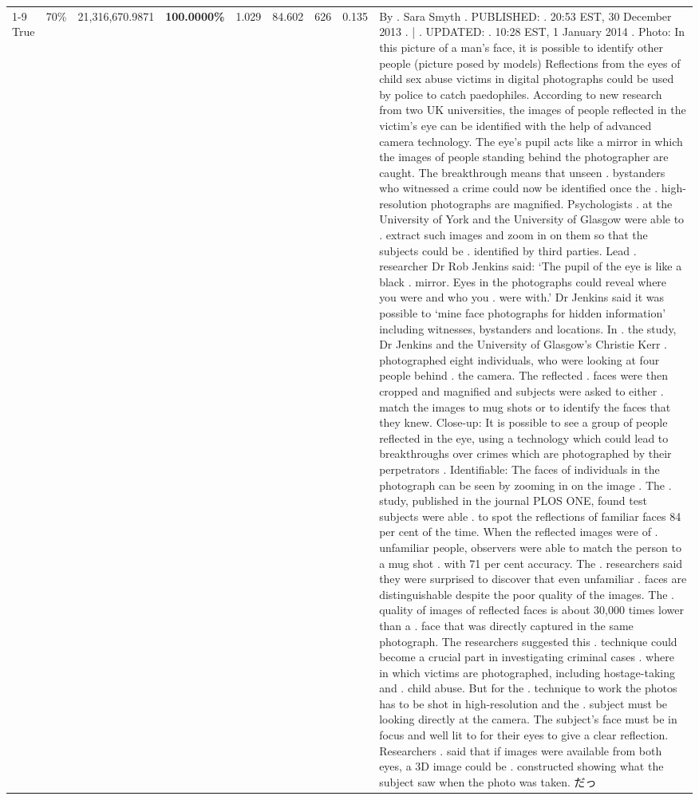 \begin{table}[H]
\begin{tabular}{lllrlllll}
\cline{1-9} \cline{2-9}
True & 70\% & 21,316,670.9871 & \bfseries \color{red} 100.0000\% & 1.029 & 84.602 & 626 & 0.135 & By . Sara Smyth . PUBLISHED: . 20:53 EST, 30 December 2013 . | . UPDATED: . 10:28 EST, 1 January 2014 . Photo: In this picture of a man's face, it is possible to identify other people (picture posed by models) Reflections from the eyes of child sex abuse victims in digital photographs could be used by police to catch paedophiles. According to new research from two UK universities, the images of people reflected in the victim's eye can be identified with the help of advanced camera technology. The eye's pupil acts like a mirror in which the images of people standing behind the photographer are caught. The breakthrough means that unseen . bystanders who witnessed a crime could now be identified once the . high-resolution photographs are magnified. Psychologists . at the University of York and the University of Glasgow were able to . extract such images and zoom in on them so that the subjects could be . identified by third parties. Lead . researcher Dr Rob Jenkins said: ‘The pupil of the eye is like a black . mirror. Eyes in the photographs could reveal where you were and who you . were with.' Dr Jenkins said it was possible to ‘mine face photographs for hidden information' including witnesses, bystanders and locations. In . the study, Dr Jenkins and the University of Glasgow's Christie Kerr . photographed eight individuals, who were looking at four people behind . the camera. The reflected . faces were then cropped and magnified and subjects were asked to either . match the images to mug shots or to identify the faces that they knew. Close-up: It is possible to see a group of people reflected in the eye, using a technology which could lead to breakthroughs over crimes which are photographed by their perpetrators . Identifiable: The faces of individuals in the photograph can be seen by zooming in on the image . The . study, published in the journal PLOS ONE, found test subjects were able . to spot the reflections of familiar faces 84 per cent of the time. When the reflected images were of . unfamiliar people, observers were able to match the person to a mug shot . with 71 per cent accuracy. The . researchers said they were surprised to discover that even unfamiliar . faces are distinguishable despite the poor quality of the images. The . quality of images of reflected faces is about 30,000 times lower than a . face that was directly captured in the same photograph. The researchers suggested this . technique could become a crucial part in investigating criminal cases . where in which victims are photographed, including hostage-taking and . child abuse. But for the . technique to work the photos has to be shot in high-resolution and the . subject must be looking directly at the camera. The subject's face must be in focus and well lit to for their eyes to give a clear reflection. Researchers . said that if images were available from both eyes, a 3D image could be . constructed showing what the subject saw when the photo was taken. だっ \\

\end{tabular}
\end{table}
